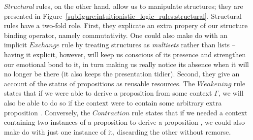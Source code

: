 \textit{Structural} rules, on the other hand, allow us to manipulate structures; they are presented in Figure~\ref{subfigure:intuitionistic_logic_rules:structural}.
Structural rules have a two-fold role.
First, they explicate an extra propery of our structure binding operator, namely commutativity.
One could also make do with an implicit $Exchange$ rule by treating structures as \textit{multisets} rather than lists -- having it explicit, however, will keep us conscious of its presence and strengthen our emotional bond to it, in turn making us really notice its absence when it will no longer be there (it also keeps the presentation tidier).
Second, they give an account of the status of propositions as reusable resources.
The $Weakening$ rule states that if we were able to derive a proposition  from some context $\Gamma$, we will also be able to do so if the context were to contain some arbitrary extra proposition .
Conversely, the $Contraction$ rule states that if we needed a context containing two instances of a proposition  to derive a proposition , we could also make do with just one instance of it, discarding the other without remorse.
%
%


